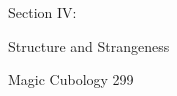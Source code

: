 
                                 Section IV:

                 Structure and Strangeness




Magic Cubology                           299

